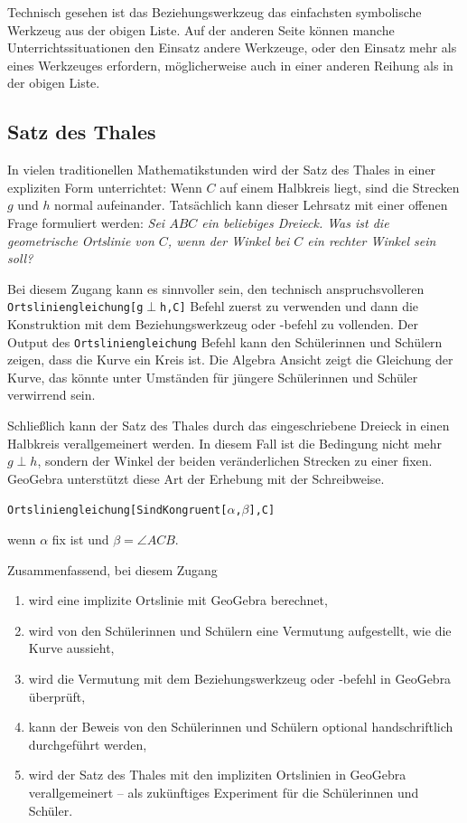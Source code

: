 \documentclass{article}
\begin{document}
Technisch gesehen ist das Beziehungswerkzeug das einfachsten symbolische Werkzeug aus der obigen Liste. Auf der anderen Seite können manche Unterrichtssituationen den Einsatz andere Werkzeuge, oder den Einsatz mehr als eines Werkzeuges erfordern, möglicherweise auch in einer anderen Reihung als in der obigen Liste.

\subsection{Satz des Thales}

In vielen traditionellen Mathematikstunden wird der Satz des Thales in einer expliziten Form unterrichtet: Wenn $C$ auf einem Halbkreis liegt, sind die Strecken $g$ und $h$ normal aufeinander. Tatsächlich kann dieser Lehrsatz mit einer offenen Frage formuliert werden: \textit{Sei $ABC$ ein beliebiges Dreieck. Was ist die geometrische Ortslinie von $C$, wenn der Winkel bei $C$ ein rechter Winkel sein soll?}

Bei diesem Zugang kann es sinnvoller sein, den technisch anspruchsvolleren \texttt{Ortsliniengleichung[g$\perp$h,C]} Befehl zuerst zu verwenden und dann die Konstruktion mit dem Beziehungswerkzeug oder -befehl zu vollenden. Der Output des   \texttt{Ortsliniengleichung} Befehl kann den Schülerinnen und Schülern zeigen, dass die Kurve ein Kreis ist. Die Algebra Ansicht zeigt die Gleichung der Kurve, das könnte unter Umständen für jüngere Schülerinnen und Schüler verwirrend sein.

Schließlich kann der Satz des Thales durch das eingeschriebene Dreieck in einen Halbkreis verallgemeinert werden. In diesem Fall ist die Bedingung nicht mehr $g\perp h$, sondern der Winkel der beiden veränderlichen Strecken zu einer fixen. GeoGebra unterstützt diese Art der Erhebung mit der Schreibweise.
\begin{center}
\texttt{Ortsliniengleichung[SindKongruent[$\alpha$,$\beta$],C]}
\end{center}
wenn $\alpha$ fix ist und $\beta=\angle{ACB}$.

Zusammenfassend, bei diesem Zugang
\begin{enumerate}
    \item wird eine implizite Ortslinie mit GeoGebra berechnet,
    \item wird von den Schülerinnen und Schülern eine Vermutung aufgestellt, wie die Kurve aussieht,
    \item wird die Vermutung mit dem Beziehungswerkzeug oder -befehl in GeoGebra überprüft,
    \item kann der Beweis von den Schülerinnen und Schülern optional handschriftlich durchgeführt werden,
    \item wird der Satz des Thales mit den impliziten Ortslinien in GeoGebra verallgemeinert -- als zukünftiges Experiment für die Schülerinnen und Schüler.
\end{enumerate}
\end{document}

